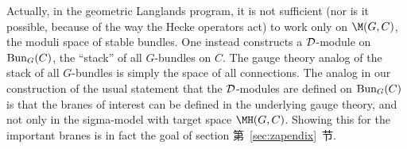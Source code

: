 Actually, in the geometric Langlands program, it is not sufficient
(nor is it possible, because of the way the Hecke operators act)
to work only on $\M(G,C)$, the moduli space of stable bundles. One
instead constructs a ${\cal D}$-module on ${\rm Bun}_G(C)$, the
``stack'' of all $G$-bundles on $C$.  The gauge theory analog of
the stack of all $G$-bundles is simply the space of all
connections. The analog in our construction of the usual statement
that the ${\cal D}$-modules are defined on ${\rm Bun}_G(C)$ is
that the branes of interest can be defined in the underlying gauge
theory, and not only in the sigma-model with target space
$\MH(G,C)$. Showing this for the important branes is in fact the
goal of section 第~\ref{sec:zapendix}~节.
